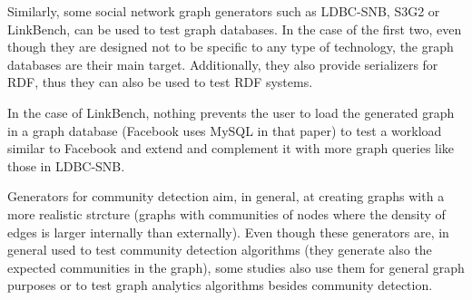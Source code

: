 Similarly, some social network graph generators such as LDBC-SNB, S3G2 or
LinkBench, can be used to test graph databases. In the case of the first two,
even though they are designed not to be specific to any type of technology,
the graph databases are their main target.  Additionally, they also provide serializers for
RDF, thus they can also be used to test RDF systems.

In the case of LinkBench, nothing prevents the user to load the generated graph
in a graph database (Facebook uses MySQL in that paper) to
test a workload similar to Facebook and extend and complement it with more
graph queries like those in LDBC-SNB.

Generators for community detection aim, in general, at creating graphs with a
more realistic strcture (graphs with communities of nodes where the density of
edges is larger internally than externally). Even though these generators are,
in general used to test community detection algorithms (they generate also the
expected communities in the graph), some studies also use them for general graph
purposes or to test graph analytics algorithms besides community detection.
